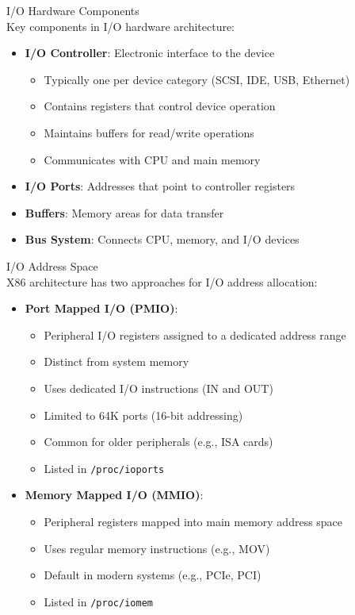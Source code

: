 \begin{definition}{I/O Hardware Components}\\
    Key components in I/O hardware architecture:
    \begin{itemize}
        \item \textbf{I/O Controller}: Electronic interface to the device
            \begin{itemize}
                \item Typically one per device category (SCSI, IDE, USB, Ethernet)
                \item Contains registers that control device operation
                \item Maintains buffers for read/write operations
                \item Communicates with CPU and main memory
            \end{itemize}
        \item \textbf{I/O Ports}: Addresses that point to controller registers
        \item \textbf{Buffers}: Memory areas for data transfer
        \item \textbf{Bus System}: Connects CPU, memory, and I/O devices
    \end{itemize}
\end{definition}

\begin{definition}{I/O Address Space}\\
    X86 architecture has two approaches for I/O address allocation:
    \begin{itemize}
        \item \textbf{Port Mapped I/O (PMIO)}:
            \begin{itemize}
                \item Peripheral I/O registers assigned to a dedicated address range
                \item Distinct from system memory
                \item Uses dedicated I/O instructions (IN and OUT)
                \item Limited to 64K ports (16-bit addressing)
                \item Common for older peripherals (e.g., ISA cards)
                \item Listed in \texttt{/proc/ioports}
            \end{itemize}
        \item \textbf{Memory Mapped I/O (MMIO)}:
            \begin{itemize}
                \item Peripheral registers mapped into main memory address space
                \item Uses regular memory instructions (e.g., MOV)
                \item Default in modern systems (e.g., PCIe, PCI)
                \item Listed in \texttt{/proc/iomem}
            \end{itemize}
    \end{itemize}
\end{definition}

